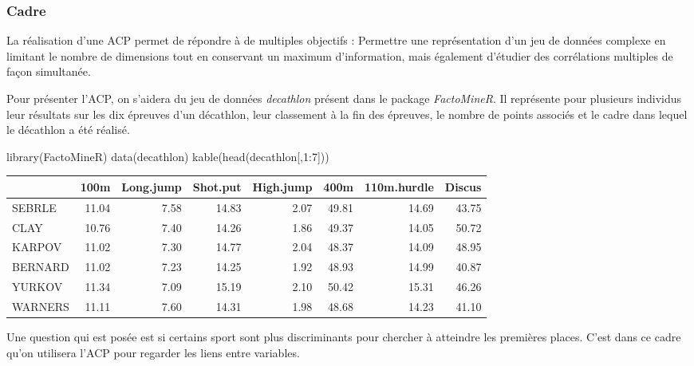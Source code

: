 \documentclass[
]{article}
\newenvironment{Shaded}{\begin{snugshade}}{\end{snugshade}}
\newcommand{\DecValTok}[1]{\textcolor[rgb]{0.00,0.00,0.81}{#1}}
\newcommand{\FunctionTok}[1]{\textcolor[rgb]{0.00,0.00,0.00}{#1}}
\newcommand{\NormalTok}[1]{#1}
\newcommand{\SpecialCharTok}[1]{\textcolor[rgb]{0.00,0.00,0.00}{#1}}
\begin{document}
\hypertarget{cadre}{%
\subsubsection{Cadre}\label{cadre}}

La réalisation d'une ACP permet de répondre à de multiples objectifs :
Permettre une représentation d'un jeu de données complexe en limitant le
nombre de dimensions tout en conservant un maximum d'information, mais
également d'étudier des corrélations multiples de façon simultanée.

Pour présenter l'ACP, on s'aidera du jeu de données \emph{decathlon}
présent dans le package \emph{FactoMineR}. Il représente pour plusieurs
individus leur résultats sur les dix épreuves d'un décathlon, leur
classement à la fin des épreuves, le nombre de points associés et le
cadre dans lequel le décathlon a été réalisé.

\begin{Shaded}
\begin{Highlighting}[]
\FunctionTok{library}\NormalTok{(FactoMineR)}
\FunctionTok{data}\NormalTok{(decathlon)}
\FunctionTok{kable}\NormalTok{(}\FunctionTok{head}\NormalTok{(decathlon[,}\DecValTok{1}\SpecialCharTok{:}\DecValTok{7}\NormalTok{]))}
\end{Highlighting}
\end{Shaded}

\begin{longtable}[]{@{}lrrrrrrr@{}}
\toprule
& 100m & Long.jump & Shot.put & High.jump & 400m & 110m.hurdle &
Discus \\
\midrule
\endhead
SEBRLE & 11.04 & 7.58 & 14.83 & 2.07 & 49.81 & 14.69 & 43.75 \\
CLAY & 10.76 & 7.40 & 14.26 & 1.86 & 49.37 & 14.05 & 50.72 \\
KARPOV & 11.02 & 7.30 & 14.77 & 2.04 & 48.37 & 14.09 & 48.95 \\
BERNARD & 11.02 & 7.23 & 14.25 & 1.92 & 48.93 & 14.99 & 40.87 \\
YURKOV & 11.34 & 7.09 & 15.19 & 2.10 & 50.42 & 15.31 & 46.26 \\
WARNERS & 11.11 & 7.60 & 14.31 & 1.98 & 48.68 & 14.23 & 41.10 \\
\bottomrule
\end{longtable}

Une question qui est posée est si certains sport sont plus discriminants
pour chercher à atteindre les premières places. C'est dans ce cadre
qu'on utilisera l'ACP pour regarder les liens entre variables.
\end{document}
